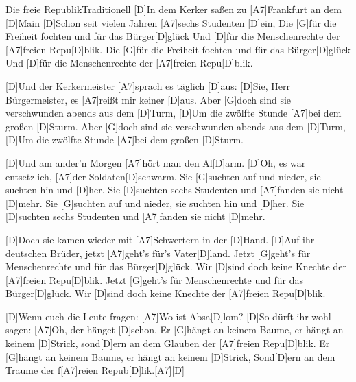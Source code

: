 \documentclass[../main.tex]{subfiles}
\begin{document}
\begin{song}{Die freie Republik}{Traditionell}{}
[D]In dem Kerker saßen zu [A7]Frankfurt an dem [D]Main
[D]Schon seit vielen Jahren [A7]sechs Studenten [D]ein,
Die [G]für die Freiheit fochten und für das Bürger[D]glück
Und [D]für die Menschenrechte der [A7]freien Repu[D]blik.
Die [G]für die Freiheit fochten und für das Bürger[D]glück
Und [D]für die Menschenrechte der [A7]freien Repu[D]blik.

[D]Und der Kerkermeister [A7]sprach es täglich [D]aus:
\glqq{}[D]Sie, Herr Bürgermeister, es [A7]reißt mir keiner [D]aus.\grqq{}
Aber [G]doch sind sie verschwunden abends aus dem [D]Turm,
[D]Um die zwölfte Stunde [A7]bei dem großen [D]Sturm.
Aber [G]doch sind sie verschwunden abends aus dem [D]Turm,
[D]Um die zwölfte Stunde [A7]bei dem großen [D]Sturm.

[D]Und am ander'n Morgen [A7]hört man den Al[D]arm.
[D]Oh, es war entsetzlich, [A7]der Soldaten[D]schwarm.
Sie [G]suchten auf und nieder, sie suchten hin und [D]her.
Sie [D]suchten sechs Studenten und [A7]fanden sie nicht [D]mehr.
Sie [G]suchten auf und nieder, sie suchten hin und [D]her.
Sie [D]suchten sechs Studenten und [A7]fanden sie nicht [D]mehr.

[D]Doch sie kamen wieder mit [A7]Schwertern in der [D]Hand.
[D]Auf ihr deutschen Brüder, jetzt [A7]geht's für's Vater[D]land.
Jetzt [G]geht's für Menschenrechte und für das Bürger[D]glück.
Wir [D]sind doch keine Knechte der [A7]freien Repu[D]blik.
Jetzt [G]geht's für Menschenrechte und für das Bürger[D]glück.
Wir [D]sind doch keine Knechte der [A7]freien Repu[D]blik.

[D]Wenn euch die Leute fragen: \glqq{}[A7]Wo ist Absa[D]lom?\grqq{}
[D]So dürft ihr wohl sagen: \glqq{}[A7]Oh, der hänget [D]schon.
Er [G]hängt an keinem Baume, er hängt an keinem [D]Strick,
sond[D]ern an dem Glauben der [A7]freien Repu[D]blik.
Er [G]hängt an keinem Baume, er hängt an keinem [D]Strick,
Sond[D]ern an dem Traume der f[A7]reien Repub[D]lik.\grqq{}[A7]{\h}[D]{\h}

\end{song}
\end{document}
